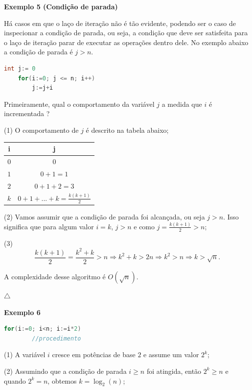\textbf{Exemplo 5 (Condição de parada)}

Há casos em que o laço de iteração não é tão evidente, podendo ser o caso de inspecionar a condição de parada, ou seja, a condição que deve ser satisfeita para o laço de iteração parar de executar as operações dentro dele. No exemplo abaixo a condição de parada é $j > n$.

\begin{lstlisting}[language=C, frame=single]
    int j:= 0
    for(i:=0; j <= n; i++)
        j:=j+i
\end{lstlisting}
Primeiramente, qual o comportamento da variável $j$ a medida que $i$ é incrementada ?

(1) O comportamento de $j$ é descrito na tabela abaixo;

\newpage
 
\begin{table}
  \centering
  \begin{tabular}{cc}
    \textbf{i} & \textbf{j} \\
    \hline
    $0$ &  $0$ \\
    $1$ &  $0+1 = 1$ \\
    $2$ & $0+1+2 = 3$ \\
    $k$ &  $0+1+...+k = \frac{k(k+1)}{2}$ \\
  \end{tabular}
\end{table}

(2) Vamos assumir que a condição de parada foi alcançada, ou seja $j>n$. Isso significa que para algum valor $i=k$, $j>n$ e como $j = \frac{k(k+1)}{2} > n$;

(3)
\[\frac{k(k+1)}{2} =  \frac{k^2+k}{2}> n \Rightarrow k^2+k > 2n \Rightarrow k^2 > n \Rightarrow k > \sqrt{n}. \]

A complexidade desse algoritmo é $O(\sqrt{n})$.

{\raggedleft $\bigtriangleup$ \par}

\textbf{Exemplo 6}

\begin{lstlisting}[language=C, frame=single]
    for(i:=0; i<n; i:=i*2)
        //procedimento
\end{lstlisting}

(1) A variável $i$ cresce em potências de base $2$ e assume um valor $2^k$;

(2) Assumindo que a condição de parada $i\geq n$ foi atingida, então $2^k \geq n$ e quando $2^k = n$, obtemos $k = \log_2(n)$;

